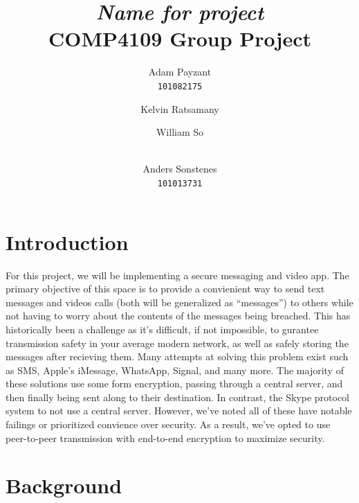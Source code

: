 \documentclass[titlepage]{article}
\title{\textit{Name for project} \\
    \large COMP4109 Group Project
}
\author{Adam Payzant \\
    \texttt{101082175} \\
    \and
    Kelvin Ratsamany \\
    \texttt{}
    \and
    William So \\
    \texttt{} \\
    \and
    Anders Sonstenes \\
    \texttt{101013731}
}
\begin{document}
    \maketitle

    \section{Introduction}

    For this project, we will be implementing a secure messaging and video app.
    The primary objective of this space is to provide a convienient way to send text messages and videos calls (both will be generalized as ``messages'') to others while not having to worry about the contents of the messages being breached.
    This has historically been a challenge as it's difficult, if not impossible, to gurantee transmission safety in your average modern network, as well as safely storing the messages after recieving them.
    Many attempts at solving this problem exist such as SMS, Apple's iMessage, WhatsApp, Signal, and many more.
    The majority of these solutions use some form encryption, passing through a central server, and then finally being sent along to their destination.
    In contrast, the Skype protocol system to not use a central server.
    However, we've noted all of these have notable failings or prioritized convience over security.
    As a result, we've opted to use peer-to-peer transmission with end-to-end encryption to maximize security.

    \section{Background}
\end{document}
